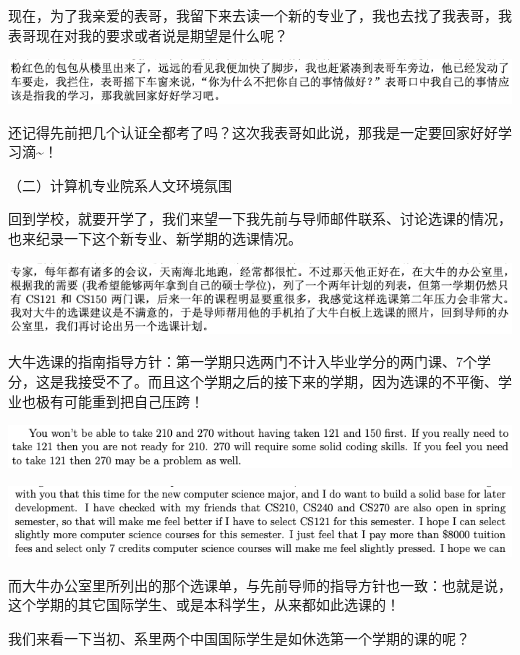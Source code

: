 \documentclass[9pt, b5paper]{article}
\begin{document}
现在，为了我亲爱的表哥，我留下来去读一个新的专业了，我也去找了我表哥，我表哥现在对我的要求或者说是期望是什么呢？

\begin{center}
\includegraphics[width=.9\linewidth]{./pic/backups_plans_20210424_092138.png}
\end{center}

还记得先前把几个认证全都考了吗？这次我表哥如此说，那我是一定要回家好好学习滴\textasciitilde{}！

（二）计算机专业院系人文环境氛围

回到学校，就要开学了，我们来望一下我先前与导师邮件联系、讨论选课的情况，也来纪录一下这个新专业、新学期的选课情况。

\begin{center}
\includegraphics[width=.9\linewidth]{./pic/backups_plans_20210424_113709.png}
\end{center}

大牛选课的指南指导方针：第一学期只选两门不计入毕业学分的两门课、7个学分，这是我接受不了。而且这个学期之后的接下来的学期，因为选课的不平衡、学业也极有可能重到把自己压跨！

\begin{center}
\includegraphics[width=.9\linewidth]{./pic/backups_plans_20210424_114045.png}
\end{center}

\begin{center}
\includegraphics[width=.9\linewidth]{./pic/backups_plans_20210424_114115.png}
\end{center}

而大牛办公室里所列出的那个选课单，与先前导师的指导方针也一致：也就是说，这个学期的其它国际学生、或是本科学生，从来都如此选课的！

我们来看一下当初、系里两个中国国际学生是如休选第一个学期的课的呢？
\end{document}

